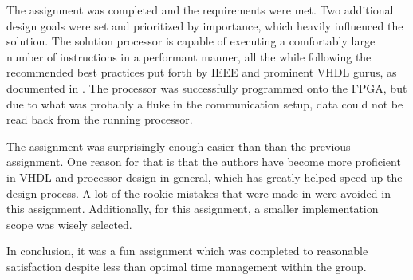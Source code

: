 The assignment was completed and the requirements were met.
Two additional design goals were set and prioritized by importance, which heavily influenced the solution.
The solution processor is capable of executing a comfortably large number of instructions in a performant manner, all the while following the recommended best practices put forth by IEEE and prominent VHDL gurus, as documented in \cite{assignment-1}.
The processor was successfully programmed onto the FPGA, but due to what was probably a fluke in the communication setup, data could not be read back from the running processor.

The assignment was surprisingly enough easier than than the previous assignment\cite{assignment-1}.
One reason for that is that the authors have become more proficient in VHDL and processor design in general, which has greatly helped speed up the design process.
A lot of the rookie mistakes that were made in \cite{assignment-1} were avoided in this assignment.
Additionally, for this assignment, a smaller implementation scope was wisely selected.

In conclusion, it was a fun assignment which was completed to reasonable satisfaction despite less than optimal time management within the group.
